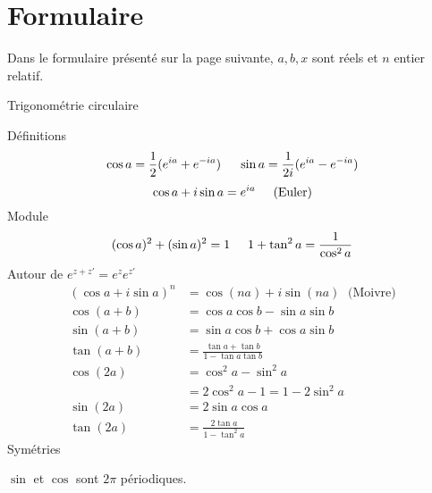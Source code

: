 

\section{Formulaire}
Dans le formulaire présenté sur la page suivante, $a, b, x$ sont réels et $n$ entier relatif.
\twocolumn
\begin{center}
 Trigonométrie circulaire
\end{center}
Définitions
\begin{displaymath}
  \cos a  = \frac{1}{2}(e^{ia}+e^{-ia}) \hspace{0.5cm} \sin a  = \frac{1}{2i}(e^{ia}-e^{-ia})
\end{displaymath}
\begin{displaymath}
  \cos a + i \sin a  = e^{ia} \hspace{0.5cm}\text{(Euler)}
\end{displaymath}
Module
\begin{displaymath}
 (\cos a)^2 + (\sin a)^2 = 1 \hspace{0.5cm} 1+\tan^2a = \frac{1}{\cos^2 a}
\end{displaymath}
Autour de $e^{z+z'}=e^{z}e^{z'}$
\begin{align*}
 (\cos a + i \sin a)^n &= \cos(na) + i \sin(na)\;\text{ (Moivre)}\\
 \cos(a+b) &= \cos a \cos b  - \sin a \sin b\\
 \sin(a+b) &= \sin a \cos b + \cos a \sin b \\
 \tan(a+b) &= \frac{\tan a + \tan b}{1-\tan a \tan b}\\
 \cos(2a) &= \cos^2 a -\sin^2 a \\
          &=2\cos^2 a -1 = 1-2\sin^2a\\
 \sin(2a) &= 2\sin a \cos a \\
 \tan(2a) &= \frac{2\tan a }{1-\tan^2 a}
\end{align*}
Symétries

$\sin$ et $\cos$ sont $2\pi$ périodiques.

